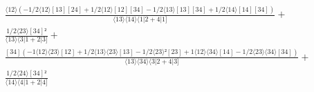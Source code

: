 \documentclass[varwidth, border=5pt]{standalone}
\begin{document}
\begin{my}
$\begin{gathered}
\scriptscriptstyle\frac{⟨12⟩(-1/2⟨12⟩[13][24]+1/2⟨12⟩[12][34]-1/2⟨13⟩[13][34]+1/2⟨14⟩[14][34])}{⟨13⟩⟨14⟩⟨1|2+4|1]} +\\
\scriptscriptstyle\frac{1/2⟨23⟩[34]²}{⟨13⟩⟨3|1+2|3]} +\\
\scriptscriptstyle\frac{[34](-1⟨12⟩⟨23⟩[12]+1/2⟨13⟩⟨23⟩[13]-1/2⟨23⟩²[23]+1⟨12⟩⟨34⟩[14]-1/2⟨23⟩⟨34⟩[34])}{⟨13⟩⟨34⟩⟨3|2+4|3]} +\\
\scriptscriptstyle\frac{1/2⟨24⟩[34]²}{⟨14⟩⟨4|1+2|4]} \phantom{+}
\end{gathered}$
\end{my}
\end{document}
